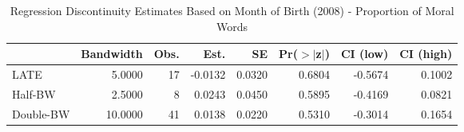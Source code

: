 \begin{table}[ht]
\centering
\begin{tabular}{lrrrrrrr}
  \hline
 & Bandwidth & Obs. & Est. & SE & Pr($>$$|$z$|$) & CI (low) & CI (high) \\ 
  \hline
LATE & 5.0000 & 17 & -0.0132 & 0.0320 & 0.6804 & -0.5674 & 0.1002 \\ 
  Half-BW & 2.5000 & 8 & 0.0243 & 0.0450 & 0.5895 & -0.4169 & 0.0821 \\ 
  Double-BW & 10.0000 & 41 & 0.0138 & 0.0220 & 0.5310 & -0.3014 & 0.1654 \\ 
   \hline
\end{tabular}
\caption{Regression Discontinuity Estimates Based on Month of Birth (2008) - Proportion of Moral Words} 
\label{tab:Xrd2008m1}
\end{table}
